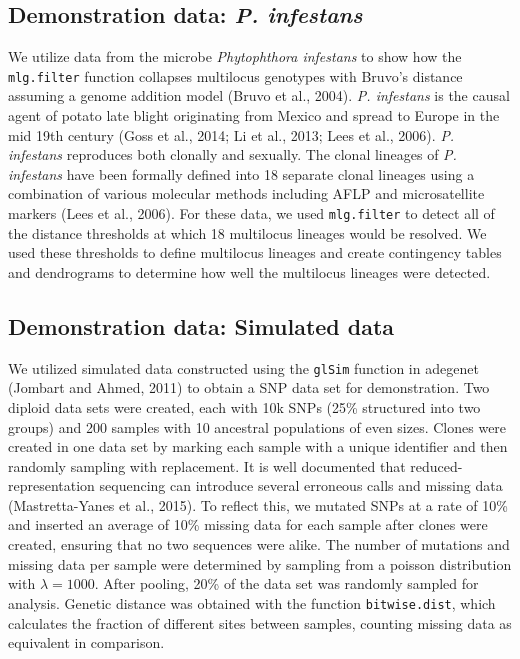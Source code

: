 \documentclass{frontiersSCNS} %
\begin{document}
\subsection*{\texorpdfstring{Demonstration data: \emph{P.
infestans}}{Demonstration data: P. infestans}}\label{demonstration-data-p.-infestans}

We utilize data from the microbe \emph{Phytophthora infestans} to show
how the \texttt{mlg.filter} function collapses multilocus genotypes with
Bruvo's distance assuming a genome addition model (Bruvo et al., 2004).
\emph{P. infestans} is the causal agent of potato late blight
originating from Mexico and spread to Europe in the mid 19th century
(Goss et al., 2014; Li et al., 2013; Lees et al., 2006). \emph{P.
infestans} reproduces both clonally and sexually. The clonal lineages of
\emph{P. infestans} have been formally defined into 18 separate clonal
lineages using a combination of various molecular methods including AFLP
and microsatellite markers (Lees et al., 2006). For these data, we used
\texttt{mlg.filter} to detect all of the distance thresholds at which 18
multilocus lineages would be resolved. We used these thresholds to
define multilocus lineages and create contingency tables and dendrograms
to determine how well the multilocus lineages were detected.

\subsection*{Demonstration data: Simulated
data}\label{demonstration-data-simulated-data}

We utilized simulated data constructed using the \texttt{glSim} function
in adegenet (Jombart and Ahmed, 2011) to obtain a SNP data set for
demonstration. Two diploid data sets were created, each with 10k SNPs
(25\% structured into two groups) and 200 samples with 10 ancestral
populations of even sizes. Clones were created in one data set by
marking each sample with a unique identifier and then randomly sampling
with replacement. It is well documented that reduced- representation
sequencing can introduce several erroneous calls and missing data
(Mastretta-Yanes et al., 2015). To reflect this, we mutated SNPs at a
rate of 10\% and inserted an average of 10\% missing data for each
sample after clones were created, ensuring that no two sequences were
alike. The number of mutations and missing data per sample were
determined by sampling from a poisson distribution with
\(\lambda = 1000\). After pooling, 20\% of the data set was randomly
sampled for analysis. Genetic distance was obtained with the function
\texttt{bitwise.dist}, which calculates the fraction of different sites
between samples, counting missing data as equivalent in comparison.
\end{document}
